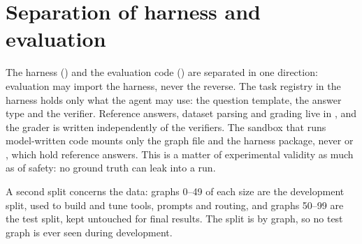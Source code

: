 \section{Separation of harness and evaluation}

The harness () and the evaluation code () are separated in one direction: evaluation may
import the harness, never the reverse. The task registry in the harness holds only what the agent may use: the
question template, the answer type and the verifier. Reference answers, dataset parsing and grading live in
, and the grader is written independently of the verifiers. The sandbox that runs model-written
code mounts only the graph file and the harness package, never  or , which hold reference
answers. This is a matter of experimental validity as much as of safety: no ground truth can leak into a run.

A second split concerns the data: graphs 0--49 of each size are the development split, used to build and tune tools,
prompts and routing, and graphs 50--99 are the test split, kept untouched for final results. The split is by graph,
so no test graph is ever seen during development.
